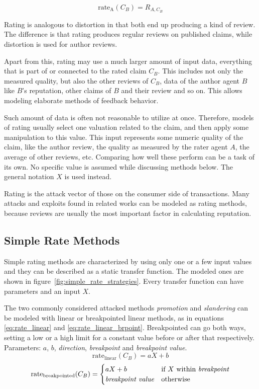 \documentclass[%
    ]{\PathToTumTemplate/thesis/tum_thesis}
\begin{document}
\begin{equation}
\mathrm{rate_{A}}(C_B) = R_{A, C_{B}}
\end{equation}

Rating is analogous to distortion in that both end up producing a kind of review.
The difference is that rating produces regular reviews on published claims, while distortion is used for author reviews.

Apart from this, rating may use a much larger amount of input data, everything that is part of or connected to the rated claim $C_B$.
This includes not only the measured quality, but also the other reviews of $C_B$, data of the author agent $B$ like $B$'s reputation, other claims of $B$ and their review and so on.
This allows modeling elaborate methods of feedback behavior.

Such amount of data is often not reasonable to utilize at once.
Therefore, models of rating usually select one valuation related to the claim, and then apply some manipulation to this value.
This input represents some numeric quality of the claim, like the author review, the quality as measured by the rater agent $A$, the average of other reviews, etc.
Comparing how well these perform can be a task of its own.
No specific value is assumed while discussing methods below.
The general notation $X$ is used instead.

Rating is the attack vector of those on the consumer side of transactions.
Many attacks and exploits found in related works can be modeled as rating methods, because reviews are usually the most important factor in calculating reputation.


\subsection{Simple Rate Methods}

Simple rating methods are characterized by using only one or a few input values and they can be described as a static transfer function.
The modeled ones are shown in figure~\ref{fig:simple_rate_strategies}.
Every transfer function can have parameters and an input $X$.

The two commonly considered attacked methods \emph{promotion} and \emph{slandering} can be modeled with linear or breakpointed linear methods, as in equations \ref{eq:rate_linear} and \ref{eq:rate_linear_brpoint}. Breakpointed can go both ways, setting a low or a high limit for a constant value before or after that respectively. Parameters: $a$, $b$, \emph{direction}, \emph{breakpoint} and \emph{breakpoint value}.
\begin{equation}\label{eq:rate_linear}
\mathrm{rate_{linear}}(C_B) = aX+b
\end{equation}
\begin{equation}\label{eq:rate_linear_brpoint}
\mathrm{rate_{breakpointed}}(C_B) = 
    \begin{cases}
      aX+b & \text{if $X$ within \emph{breakpoint}} \\
      \text{\emph{breakpoint value}} & \text{otherwise}\\
    \end{cases}
\end{equation}
\end{document}
